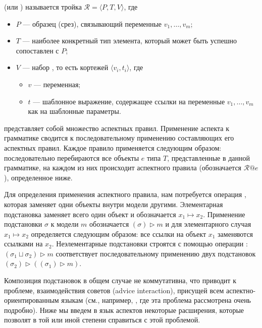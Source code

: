 \begin{Def}
 (или ) называется тройка
$\mathcal{R} = \langle P, T, V \rangle$, где
\begin{itemize}
\item $P$ --- образец (срез), связывающий переменные $v_1,\ldots,v_m$;
\item $T$ --- наиболее конкретный тип элемента, который может быть успешно сопоставлен с $P$;
\item $V$ --- набор , то есть кортежей $\langle v_i, t_i \rangle$, где
	\begin{itemize}
		\item $v$ --- переменная;
		\item $t$ --- шаблонное выражение, содержащее ссылки на переменные $v_1,\ldots,v_m$ как на шаблонные параметры.
	\end{itemize}
\end{itemize}
\end{Def}
\newcommand{\rapply}[2]{#1@#2}
 представляет собой множество аспектных правил. Применение аспекта к грамматике сводится к последовательному применению составляющих его аспектных правил. Каждое правило применяется следующим образом: последовательно перебираются все объекты $e$ типа $T$, представленные в данной грамматике, на каждом из них происходит  аспектного правила (обозначается $\rapply{\mathcal{R}}{e}$), определенное ниже.

\newcommand{\subst}[2]{ #1 \mapsto #2 }
\newcommand{\apply}[2]{\left( #1 \right) \triangleright #2}
Для определения применения аспектного правила, нам потребуется операция , которая заменяет одни объекты внутри модели другими. Элементарная подстановка заменяет всего один объект и обозначается $\subst{x_1}{x_2}$. Применение подстановки $\sigma$ к модели $m$ обозначается $\apply{\sigma}{m}$ и для элементарного случая $\subst{x_1}{x_2}$ определяется следующим образом: все ссылки на объект $x_1$ заменяются ссылками на $x_2$.
Неэлементарные подстановки строятся с помощью операции : $\apply{\sigma_1 \sqcup \sigma_2}{m}$ соответствует последовательному применению двух подстановок $\apply{\sigma_2}{\left( \apply{\sigma_1}{m} \right)}$.

\begin{Note}
Композиция подстановок в общем случае не коммутативна, что приводит к проблеме, взаимодействия советов (advice interaction), присущей всем аспектно-ориентированным языкам (см., например, \cite{JAMI}, где эта проблема рассмотрена очень подробно). Ниже мы введем в язык аспектов некоторые расширения, которые позволят в той или иной степени справиться с этой проблемой.
\end{Note}

